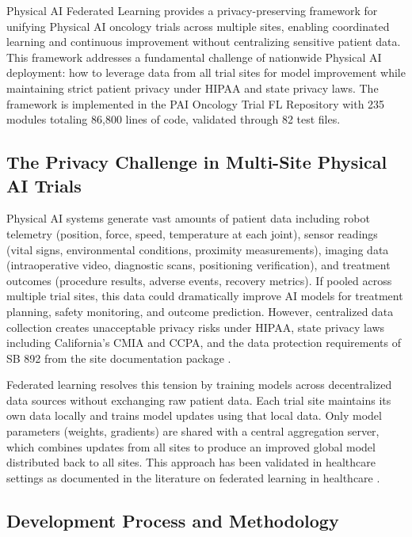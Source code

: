 
Physical AI Federated Learning \cite{fl-paper} provides a privacy-preserving
framework for unifying Physical AI oncology trials across multiple sites,
enabling coordinated learning and continuous improvement without centralizing
sensitive patient data. This framework addresses a fundamental challenge of
nationwide Physical AI deployment: how to leverage data from all trial sites for
model improvement while maintaining strict patient privacy under HIPAA
\cite{hipaa} and state privacy laws. The framework is implemented in the PAI
Oncology Trial FL Repository \cite{fl-repo} with 235 modules totaling 86,800
lines of code, validated through 82 test files.

\subsection{The Privacy Challenge in Multi-Site Physical AI Trials}
\label{subsec:fl-privacy}

Physical AI systems generate vast amounts of patient data including robot
telemetry (position, force, speed, temperature at each joint), sensor readings
(vital signs, environmental conditions, proximity measurements), imaging data
(intraoperative video, diagnostic scans, positioning verification), and
treatment outcomes (procedure results, adverse events, recovery metrics). If
pooled across multiple trial sites, this data could dramatically improve AI
models for treatment planning, safety monitoring, and outcome prediction.
However, centralized data collection creates unacceptable privacy risks under
HIPAA, state privacy laws including California's CMIA and CCPA, and the data
protection requirements of SB 892 from the site documentation package
\cite{site-docs}.

Federated learning resolves this tension by training models across
decentralized data sources without exchanging raw patient data. Each trial site
maintains its own data locally and trains model updates using that local data.
Only model parameters (weights, gradients) are shared with a central
aggregation server, which combines updates from all sites to produce an
improved global model distributed back to all sites. This approach has been
validated in healthcare settings as documented in the literature on federated
learning in healthcare \cite{federated-learning-healthcare}.

\subsection{Development Process and Methodology}
\label{subsec:fl-methods}

